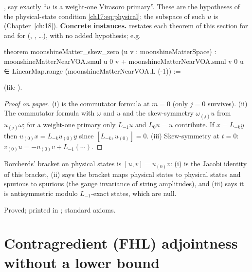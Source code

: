 \begin{dictionary}
,  say exactly ``$u$ is a weight-one Virasoro primary''.  These are the hypotheses of the
physical-state condition \eqref{ch17:eq:physical}; the subspace of such $u$ is 
(Chapter~\ref{ch:18}).  \textbf{Concrete instances.} 
restates each theorem of this section for  and for 
(, , \dots), with no added hypothesis; e.g.
\end{dictionary}
\begin{leancode}
theorem moonshineMatter_skew_zero (u v : moonshineMatterSpace) :
    moonshineMatterNearVOA.smul u 0 v + moonshineMatterNearVOA.smul v 0 u ∈
      LinearMap.range (moonshineMatterNearVOA.L (-1)) :=
\end{leancode}
\noindent (file ).

\begin{proof}[Proof on paper]
(i) is the commutator formula at $m=0$ (only $j=0$ survives).  (ii) The commutator formula with $\omega$ and $u$ and the
skew-symmetry $\omega_{(j)}u$ from $u_{(j)}\omega$; for a weight-one primary only $L_{-1}u$ and $L_0u=u$ contribute.  If
$x=L_{-k}y$ then $u_{(0)}x=L_{-k}u_{(0)}y$ since $[L_{-k},u_{(0)}]=0$.  (iii) Skew-symmetry at $t=0$:
$v_{(0)}u=-u_{(0)}v+L_{-1}(\cdots)$.
\end{proof}

\begin{physics}
Borcherds' bracket on physical states is $[u,v]=u_{(0)}v$: (i) is the Jacobi identity of this bracket, (ii) says the
bracket maps physical states to physical states and spurious to spurious (the gauge invariance of string amplitudes),
and (iii) says it is antisymmetric modulo $L_{-1}$-exact states, which are null.
\end{physics}

\begin{status}
Proved; printed in ; standard axioms.
\end{status}

\section{Contragredient (FHL) adjointness without a lower bound}\label{ch17:sec:fhl}

